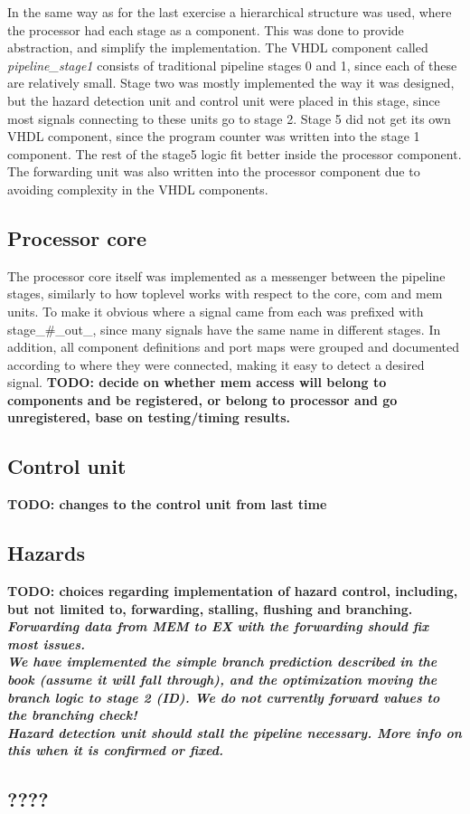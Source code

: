 In the same way as for the last exercise a hierarchical structure was used,
where the processor had each stage as a component. This was done to provide
abstraction, and simplify the implementation. The VHDL component called
\emph{pipeline\_stage1} consists of traditional pipeline stages 0 and 1, since
each of these are relatively small. Stage two was mostly implemented the way it
was designed, but the hazard detection unit and control unit were placed in this
stage, since most signals connecting to these units go to stage 2. Stage 5 did
not get its own VHDL component, since the program counter was written into the
stage 1 component. The rest of the stage5 logic fit better inside the processor
component. The forwarding unit was also written into the processor component
due to avoiding complexity in the VHDL components.
\subsection{Processor core}
The processor core itself was implemented as a messenger between the pipeline
stages, similarly to how toplevel works with respect to the core, com and mem
units. To make it obvious where a signal came from each was prefixed with
stage\_\#\_out\_, since many signals have the same name in different stages. In
addition, all component definitions and port maps were grouped and documented
according to where they were connected, making it easy to detect a desired
signal.
\bf{TODO: decide on whether mem access will belong to components and be registered, or belong to processor and go unregistered, base on testing/timing results.}

\subsection{Control unit}
\bf{TODO: changes to the control unit from last time}
\subsection{Hazards}
\bf{TODO: choices regarding implementation of hazard control, including, but not limited to, forwarding, stalling, flushing and branching.}
\emph{Forwarding data from MEM to EX with the forwarding should fix most issues.
\\
We have implemented the simple branch prediction described in the book
(assume it will fall through), and the optimization moving the branch logic to
stage 2 (ID). We do not currently forward values to the branching check!
\\
Hazard detection unit should stall the pipeline necessary. More info on this
when it is confirmed or fixed.}

\subsection{????}